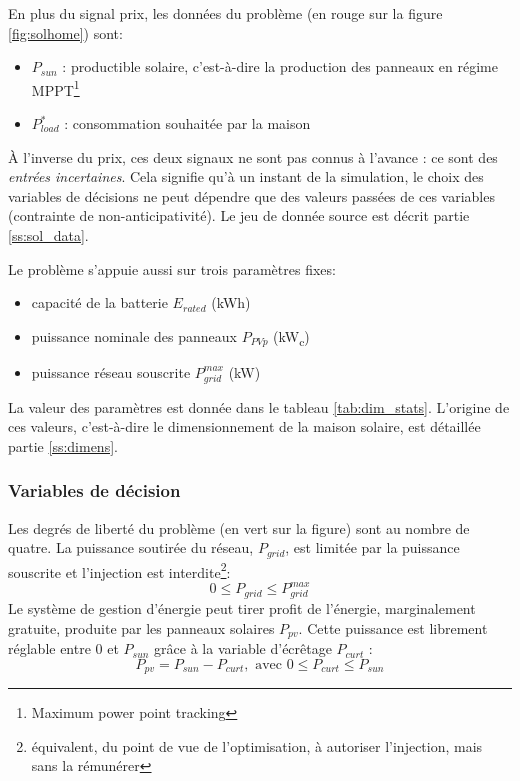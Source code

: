 \documentclass[a4paper,10pt,twocolumn]{article}
\newcommand\sub[1]{\textsubscript{#1}}
\newcommand\kWc{kW\sub{c}{}}
\begin{document}
En plus du signal prix, les données du problème (en rouge sur la figure \ref{fig:solhome}) sont:

\begin{itemize}
 \item $P_{sun}$ : productible solaire, c'est-à-dire la production des panneaux en régime
MPPT\footnote{Maximum power point tracking}
 \item $P_{load}^*$ : consommation souhaitée par la maison
\end{itemize}

À l'inverse du prix, ces deux signaux ne sont pas connus à l'avance :
ce sont des \emph{entrées incertaines}.
Cela signifie qu'à un instant de la simulation, le choix des variables
de décisions ne peut dépendre que des valeurs passées de ces variables
(contrainte de non-anticipativité).
Le jeu de donnée source est décrit partie \ref{ss:sol_data}.

Le problème s'appuie aussi sur trois paramètres fixes:
\begin{itemize}
 \item capacité de la batterie $E_{rated}$ (kWh)
 \item puissance nominale des panneaux $P_{PVp}$ (\kWc)
 \item puissance réseau souscrite $P_{grid}^{max}$ (kW)
\end{itemize}

La valeur des paramètres est donnée dans le tableau \ref{tab:dim_stats}.
L'origine de ces valeurs, c'est-à-dire le dimensionnement de la maison solaire,
est détaillée partie \ref{ss:dimens}.

\subsubsection{Variables de décision}
\label{sss:opti_var}

Les degrés de liberté du problème (en vert sur la figure) sont au nombre de quatre.
La puissance soutirée du réseau, $P_{grid}$,
est limitée par la puissance souscrite
et l'injection est interdite\footnote{
équivalent, du point de vue de l'optimisation, à autoriser l'injection, mais sans la rémunérer}:
%
\begin{equation}
  0 \leq P_{grid} \leq P_{grid}^{max}
\end{equation}
%
Le système de gestion d'énergie peut tirer profit de l'énergie, marginalement
gratuite, produite par les panneaux solaires $P_{pv}$.
Cette puissance est librement réglable entre 0 et $P_{sun}$ grâce à la variable
d'écrêtage $P_{curt}$ :
%
\begin{equation}
  P_{pv} = P_{sun} - P_{curt}, \text{ avec } 0 \leq P_{curt} \leq P_{sun}
\end{equation}
\end{document}
